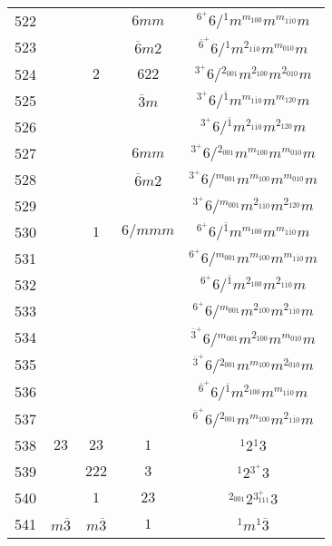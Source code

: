\begin{longtable}{ccccc}
  522 &  &  & $6mm$ & ${}^{6^{+}} 6  / {}^{1} m {}^{m_{100}} m {}^{m_{1\overline{1}0}} m $\\
  523 &  &  & $\overline{6}m2$ & ${}^{\overline{6}^{+}} 6  / {}^{1} m {}^{2_{1\overline{1}0}} m {}^{m_{010}} m $\\
  524 &  & $2$ & $622$ & ${}^{3^{+}} 6  / {}^{2_{001}} m {}^{2_{100}} m {}^{2_{010}} m $\\
  525 &  &  & $\overline{3}m$ & ${}^{3^{+}} 6  / {}^{\overline{1}} m {}^{m_{1\overline{1}0}} m {}^{m_{120}} m $\\
  526 &  &  &  & ${}^{3^{+}} 6  / {}^{\overline{1}} m {}^{2_{1\overline{1}0}} m {}^{2_{120}} m $\\
  527 &  &  & $6mm$ & ${}^{3^{+}} 6  / {}^{2_{001}} m {}^{m_{100}} m {}^{m_{010}} m $\\
  528 &  &  & $\overline{6}m2$ & ${}^{3^{+}} 6  / {}^{m_{001}} m {}^{m_{100}} m {}^{m_{010}} m $\\
  529 &  &  &  & ${}^{3^{+}} 6  / {}^{m_{001}} m {}^{2_{1\overline{1}0}} m {}^{2_{120}} m $\\
  530 &  & $1$ & $6/mmm$ & ${}^{6^{+}} 6  / {}^{\overline{1}} m {}^{m_{100}} m {}^{m_{1\overline{1}0}} m $\\
  531 &  &  &  & ${}^{6^{+}} 6  / {}^{m_{001}} m {}^{m_{100}} m {}^{m_{1\overline{1}0}} m $\\
  532 &  &  &  & ${}^{6^{+}} 6  / {}^{\overline{1}} m {}^{2_{100}} m {}^{2_{1\overline{1}0}} m $\\
  533 &  &  &  & ${}^{6^{+}} 6  / {}^{m_{001}} m {}^{2_{100}} m {}^{2_{1\overline{1}0}} m $\\
  534 &  &  &  & ${}^{\overline{3}^{+}} 6  / {}^{m_{001}} m {}^{2_{100}} m {}^{m_{010}} m $\\
  535 &  &  &  & ${}^{\overline{3}^{+}} 6  / {}^{2_{001}} m {}^{m_{100}} m {}^{2_{010}} m $\\
  536 &  &  &  & ${}^{\overline{6}^{+}} 6  / {}^{\overline{1}} m {}^{2_{100}} m {}^{m_{1\overline{1}0}} m $\\
  537 &  &  &  & ${}^{\overline{6}^{+}} 6  / {}^{2_{001}} m {}^{m_{100}} m {}^{2_{1\overline{1}0}} m $\\
  538 & $23$ & $23$ & $1$ & ${}^{1} 2 {}^{1} 3 $\\
  539 &  & $222$ & $3$ & ${}^{1} 2 {}^{3^{+}} 3 $\\
  540 &  & $1$ & $23$ & ${}^{2_{001}} 2 {}^{3^{+}_{111}} 3 $\\
  541 & $m\overline{3}$ & $m\overline{3}$ & $1$ & ${}^{1} m {}^{1} \overline{3} $\\

\end{longtable}
